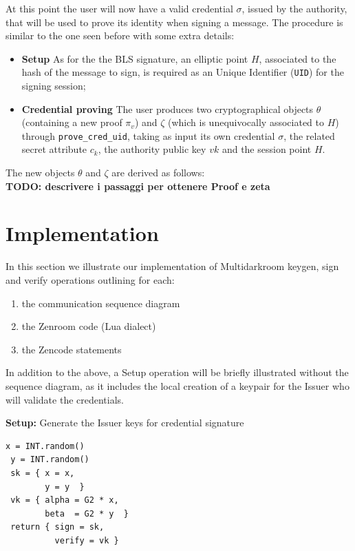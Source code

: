 \documentclass[twocolumn]{article}
\begin{document}
At this point the user will now have a valid credential $\sigma$, issued by the authority, that will be used to prove its identity when signing a message. The procedure is similar to the one seen before with some extra details:
\begin{itemize}
    \item \textbf{Setup} As for the the BLS signature, an elliptic point $H$, associated to the hash of the message to sign, is required as an Unique Identifier (\verb!UID!) for the signing session;
    \item \textbf{Credential proving} The user produces two cryptographical objects $\theta$ (containing a new proof $\pi_v$) and $\zeta$ (which is unequivocally associated to $H$) through \verb!prove_cred_uid!, taking as input its own credential $\sigma$, the related secret attribute $c_k$, the authority public key $vk$ and the session point $H$.
\end{itemize}
The new objects $\theta$ and $\zeta$ are derived as follows:\\
\textbf{TODO: descrivere i passaggi per ottenere Proof e zeta}

\section{Implementation}
\label{sec:implementation}

\lstset{basicstyle=\ttfamily\scriptsize, breaklines=true}

In this section we illustrate our implementation of Multidarkroom
keygen, sign and verify operations outlining for each:

\begin{enumerate}
  \item the communication sequence diagram
  \item the Zenroom code (Lua dialect)
  \item the Zencode statements
\end{enumerate}

In addition to the above, a Setup operation will be briefly
illustrated without the sequence diagram, as it includes the local
creation of a keypair for the Issuer who will validate the
credentials.

\textbf{Setup:} Generate the Issuer keys for credential signature

\begin{lstlisting}[style=lua]
 x = INT.random()
 y = INT.random()
 sk = { x = x,
        y = y  }
 vk = { alpha = G2 * x,
        beta  = G2 * y  }
 return { sign = sk,
          verify = vk }
\end{lstlisting}
\end{document}
